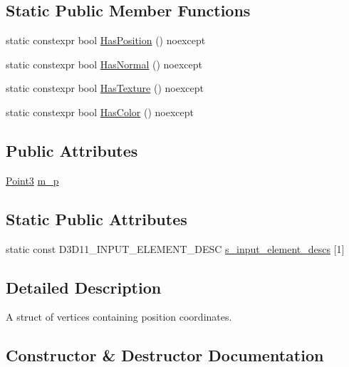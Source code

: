 \subsection*{Static Public Member Functions}
\begin{DoxyCompactItemize}
\item 
static constexpr bool \hyperlink{structmage_1_1rendering_1_1_vertex_position_a23134a6f43a36f72f94ec6dba3024503}{Has\+Position} () noexcept
\item 
static constexpr bool \hyperlink{structmage_1_1rendering_1_1_vertex_position_abf33917c1c93dfcffd25c146b53189e8}{Has\+Normal} () noexcept
\item 
static constexpr bool \hyperlink{structmage_1_1rendering_1_1_vertex_position_aac518715cc922a0094261f075f8ae80b}{Has\+Texture} () noexcept
\item 
static constexpr bool \hyperlink{structmage_1_1rendering_1_1_vertex_position_afe87ed5fda84b4acc17a94a07d389ff7}{Has\+Color} () noexcept
\end{DoxyCompactItemize}
\subsection*{Public Attributes}
\begin{DoxyCompactItemize}
\item 
\hyperlink{structmage_1_1_point3}{Point3} \hyperlink{structmage_1_1rendering_1_1_vertex_position_a49602fa786c64fb0fca47a0a0992f779}{m\+\_\+p}
\end{DoxyCompactItemize}
\subsection*{Static Public Attributes}
\begin{DoxyCompactItemize}
\item 
static const D3\+D11\+\_\+\+I\+N\+P\+U\+T\+\_\+\+E\+L\+E\+M\+E\+N\+T\+\_\+\+D\+E\+SC \hyperlink{structmage_1_1rendering_1_1_vertex_position_a094b822673f010526197174900dd4349}{s\+\_\+input\+\_\+element\+\_\+descs} \mbox{[}1\mbox{]}
\end{DoxyCompactItemize}


\subsection{Detailed Description}
A struct of vertices containing position coordinates. 

\subsection{Constructor \& Destructor Documentation}
\hypertarget{structmage_1_1rendering_1_1_vertex_position_a9df4fa391d76a89997e8b512fc3142d2}{}\label{structmage_1_1rendering_1_1_vertex_position_a9df4fa391d76a89997e8b512fc3142d2} 
